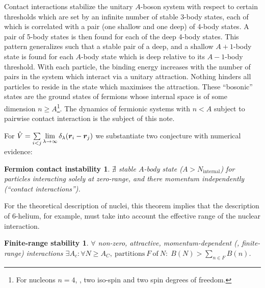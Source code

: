 \documentclass[aps,prd,onecolumn
,tightenlines,letterpaper,
notitlepage,11pt,linenumbers,
nofootinbib]{revtex4-1}
\begin{document}
Contact interactions stabilize the unitary $A$-boson system
with respect to certain thresholds which are set by an infinite
number of stable 3-body states, each of which is correlated with a
pair (one shallow and one deep) of 4-body states.
A pair of 5-body states is then found for each of the deep 4-body states.
This pattern generalizes such that a stable pair of a deep, and a shallow $A+1$-body state
is found for each $A$-body state which is deep relative to its $A-1$-body threshold.
With each particle, the binding energy increases with the number of pairs
in the system which interact via a unitary attraction. Nothing hinders all particles
to reside in the state which maximises the attraction.
These ``bosonic'' states are the ground states of fermions whose internal space
is of some dimension $n\geq A$\footnote{For nucleons $n=4$, \ie, two iso-spin and two spin degrees of freedom.}. The dynamics of fermionic systems with $n<A$ subject
to pairwise contact interaction is the subject of this note.

For
$\hat{V}=\sum\limits_{i<j}\lim\limits_{\lambda\to\infty}\delta_\lambda(\boldsymbol{r}_i-\boldsymbol{r}_j)$
we substantiate two conjecture with numerical evidence:

\newtheorem*{thm1}{Fermion contact instability}
\begin{thm1}
$\nexists$ stable $A$-body state ($A>N_\text{internal}$) for particles interacting
solely at zero-range, and there momentum independently (``contact interactions'').
\end{thm1}

For the theoretical description of nuclei, this theorem implies that the description of
6-helium, for example, must take into account the effective range of the nuclear interaction.

\newtheorem*{thm2}{Finite-range stability}
\begin{thm2}
$\forall$ non-zero, attractive, momentum-dependent (\ie, finite-range) interactions
$\exists A_c:\forall N\geq A_C,~\text{partitions}~F~\text{of}~N:\;B(N)>\sum\limits_{n\in F}B(n)$.
\end{thm2}
\end{document}
